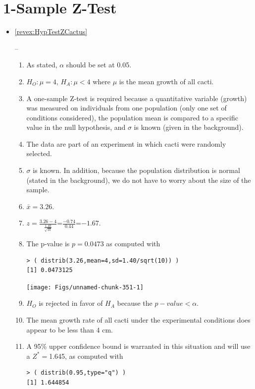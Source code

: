 \documentclass[10pt,openany]{book}\usepackage[]{graphicx}\usepackage[]{color}
\makeatletter
\newenvironment{kframe}{%
 \def\at@end@of@kframe{}%
 \ifinner\ifhmode%
  \def\at@end@of@kframe{\end{minipage}}%
  \begin{minipage}{\columnwidth}%
 \fi\fi%
 \def\FrameCommand##1{\hskip\@totalleftmargin \hskip-\fboxsep
 \colorbox{shadecolor}{##1}\hskip-\fboxsep
     \hskip-\linewidth \hskip-\@totalleftmargin \hskip\columnwidth}%
 \MakeFramed {\advance\hsize-\width
   \@totalleftmargin\z@ \linewidth\hsize
   \@setminipage}}%
 {\par\unskip\endMakeFramed%
 \at@end@of@kframe}
\newenvironment{knitrout}{}{} %
\makeatother
\begin{document}
\section*{1-Sample Z-Test}
\begin{itemize}
  \item \hypertarget{ans:HypTestZCactus}{\ref{revex:HypTestZCactus}} --
    \begin{enumerate}
      \item As stated, $\alpha$ should be set at 0.05.
      \item $H_{O}:\mu=4$, $H_{A}:\mu<4$ where $\mu$ is the mean growth of all cacti.
      \item A one-sample Z-test is required because a quantitative variable (growth) was measured on individuals from one population (only one set of conditions considered), the population mean is compared to a specific value in the null hypothesis, and $\sigma$ is known (given in the background).
      \item The data are part of an experiment in which cacti were randomly selected.
      \item $\sigma$ is known.  In addition, because the population distribution is normal (stated in the background), we do not have to worry about the size of the sample.
      \item $\bar{x}=3.26$.
      \item $z=\frac{3.26-4}{\frac{1.40}{\sqrt{10}}}$=$\frac{-0.74}{0.44}$=$-1.67$.
      \item The p-value is $p=0.0473$ as computed with
\begin{knitrout}
\color{fgcolor}\begin{kframe}
\begin{verbatim}
> ( distrib(3.26,mean=4,sd=1.40/sqrt(10)) )
[1] 0.0473125
\end{verbatim}
\end{kframe}

{\centering \texttt{[image: Figs/unnamed-chunk-351-1]} 

}



\end{knitrout}
      \item $H_{O}$ is rejected in favor of $H_{A}$ because the $p-value<\alpha$.
      \item The mean growth rate of all cacti under the experimental conditions does appear to be less than 4 cm.
      \item A 95\% upper confidence bound is warranted in this situation and will use a $Z^{*}=$1.645, as computed with
\begin{knitrout}
\color{fgcolor}\begin{kframe}
\begin{verbatim}
> ( distrib(0.95,type="q") )
[1] 1.644854
\end{verbatim}
\end{kframe}


\end{knitrout}
\end{enumerate}
\end{itemize}
\end{document}
